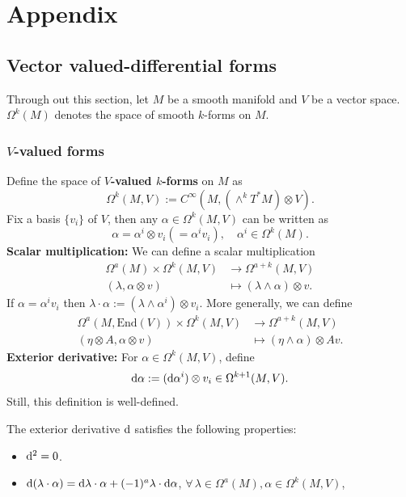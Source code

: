 \section*{Appendix}

\subsection*{Vector valued-differential forms}
Through out this section, let $M$ be a smooth manifold and $V$ be a vector space. 
$\Omega^k(M)$ denotes the space of smooth $k$-forms on $M$.
\subsubsection*{$V$-valued forms}
\begin{definition}
    Define the space of \textbf{$V$-valued $k$-forms} on $M$ as 
    \begin{equation*}
        \Omega^k(M,V) := C^\infty(M, (\wedge^k T^*M)\otimes V).
    \end{equation*}
    Fix a basis $\{v_i\}$ of $V$, then any $\alpha\in \Omega^k(M,V)$ can be written as
    \begin{equation*}
        \alpha = \alpha^i\otimes v_i(=\alpha^i v_i), \quad \alpha^i\in \Omega^k(M).
    \end{equation*}
    \textbf{Scalar multiplication:} We can define a scalar multiplication 
    \begin{align*}
        \Omega^a(M)\times \Omega^k(M,V) &\to \Omega^{a+k}(M,V) \\
        (\lambda,\alpha\otimes v) &\mapsto (\lambda\wedge\alpha)\otimes v. 
    \end{align*}
    If $\alpha=\alpha^iv_i$ then $\lambda\cdot \alpha := (\lambda\wedge \alpha^i)\otimes v_i$.
    More generally, we can define
    \begin{align*}
        \Omega^a(M,\mathrm{End}(V))\times \Omega^k(M,V) &\to \Omega^{a+k}(M,V) \\
        (\eta\otimes A,\alpha\otimes v) &\mapsto (\eta\wedge \alpha)\otimes Av.
    \end{align*}
    \textbf{Exterior derivative:} For $\alpha\in\Omega^k(M,V)$, define
    \begin{equation*}
        {\rm d}\alpha := ({\rm d}\alpha^i)\otimes v_i\in\Omega^{k+1}(M,V).
    \end{equation*}
    Still, this definition is well-defined. 
\end{definition}
\begin{proposition}
     The exterior derivative ${\rm d}$ satisfies the following properties:
    \begin{itemize}
        \item ${\rm d}^2 = 0$.
        \item ${\rm d}(\lambda\cdot \alpha) = {\rm d}\lambda\cdot \alpha + (-1)^a \lambda\cdot {\rm d}\alpha$, 
        $\forall\,\lambda\in\Omega^a(M),\alpha\in\Omega^k(M,V)$, 
    \end{itemize}
\end{proposition}

